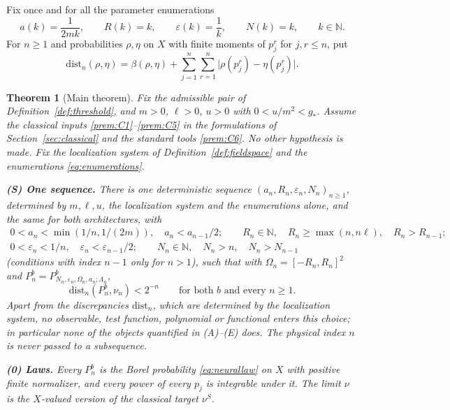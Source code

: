 \documentclass[11pt]{article}
\theoremstyle{plain}
\newtheorem{theorem}{Theorem}[section]
\theoremstyle{definition}
\theoremstyle{remark}
\newcommand{\N}{\mathbb{N}}
\newcommand{\dist}{\mathrm{dist}}
\begin{document}
Fix once and for all the parameter enumerations
\begin{equation}\label{eq:enumerations}
a(k)=\frac{1}{2mk},\qquad R(k)=k,\qquad \varepsilon(k)=\frac1k,\qquad N(k)=k,\qquad k\in\N .
\end{equation}
For $n\ge1$ and probabilities $\rho,\eta$ on $X$ with finite moments of $p_j^{r}$
for $j,r\le n$, put
\begin{equation}\label{eq:distn}
\dist_n(\rho,\eta)=\beta(\rho,\eta)+\sum_{j=1}^{n}\sum_{r=1}^{n}\bigl|\rho(p_j^{r})-\eta(p_j^{r})\bigr| .
\end{equation}

\begin{theorem}[Main theorem]\label{thm:main}
Fix the admissible pair of Definition~\ref{def:threshold}, and $m>0$, $\ell>0$,
$u>0$ with $0<u/m^{2}<g_{*}$. Assume the classical inputs
\ref{prem:C1}--\ref{prem:C5} in the formulations of Section~\ref{sec:classical}
and the standard tools \ref{prem:C6}. No other hypothesis is made. Fix the
localization system of Definition~\ref{def:fieldspace} and the enumerations
\eqref{eq:enumerations}.

\smallskip\noindent\textbf{(S) One sequence.} There is one deterministic
sequence $(a_n,R_n,\varepsilon_n,N_n)_{n\ge1}$, determined by $m,\ell,u$, the
localization system and the enumerations alone, and the same for both
architectures, with
\begin{gather*}
0<a_n<\min(1/n,1/(2m)),\quad a_n<a_{n-1}/2;\qquad
R_n\in\N,\quad R_n\ge\max(n,n\ell),\quad R_n>R_{n-1};\\
0<\varepsilon_n<1/n,\quad \varepsilon_n<\varepsilon_{n-1}/2;\qquad
N_n\in\N,\quad N_n>n,\quad N_n>N_{n-1}
\end{gather*}
(conditions with index $n-1$ only for $n>1$), such that with
$\Omega_n=[-R_n,R_n]^{2}$ and $P^{b}_{n}=P^{b}_{N_n,\varepsilon_n,\Omega_n,a_n;\Lambda_n}$,
\begin{equation}\label{eq:mainseq}
\dist_n(P^{b}_{n},\nu_n)<2^{-n}\qquad\text{for both $b$ and every $n\ge1$.}
\end{equation}
Apart from the discrepancies $\dist_n$, which are determined by the localization
system, no observable, test function, polynomial or functional enters this
choice; in particular none of the objects quantified in (A)--(E) does. The
physical index $n$ is never passed to a subsequence.

\smallskip\noindent\textbf{(0) Laws.} Every $P^{b}_{n}$ is the Borel probability
\eqref{eq:neurallaw} on $X$ with positive finite normalizer, and every power of
every $p_j$ is integrable under it. The limit $\nu$ is the $X$-valued version of
the classical target $\nu^{S}$.


\end{theorem}
\end{document}
